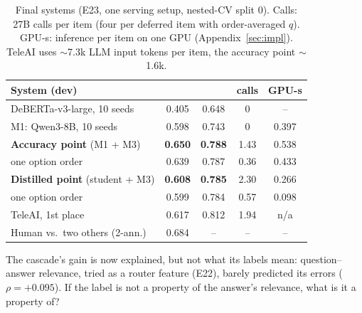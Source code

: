\begin{table}[t]
\centering
\small
\setlength{\tabcolsep}{2.2pt}
\begin{tabular}{@{}lcccc@{}}
\toprule
System (dev) & \Stwo{} & \Sone{} & calls & GPU-s \\
\midrule
DeBERTa-v3-large, 10 seeds & 0.405 & 0.648 & 0 & -- \\
M1: Qwen3-8B, 10 seeds & 0.598 & 0.743 & 0 & 0.397 \\
\textbf{Accuracy point} (M1 + M3) & \textbf{0.650} & \textbf{0.788} & 1.43 & 0.538 \\
\quad one option order & 0.639 & 0.787 & 0.36 & 0.433 \\
\textbf{Distilled point} (student + M3) & \textbf{0.608} & \textbf{0.785} & 2.30 & 0.266 \\
\quad one option order & 0.599 & 0.784 & 0.57 & 0.098 \\
\midrule
TeleAI, 1st place & 0.617 & 0.812 & 1.94 & n/a \\
Human vs.\ two others (2-ann.) & 0.684 & -- & -- & -- \\
\bottomrule
\end{tabular}
\caption{Final systems (E23, one serving setup, nested-CV split 0). Calls: 27B calls per item (four per deferred item with order-averaged $q$). GPU-s: inference per item on one GPU (Appendix~\ref{sec:impl}). TeleAI uses ${\sim}$7.3k LLM input tokens per item, the accuracy point ${\sim}$1.6k.}
\label{tab:final}
\end{table}

The cascade's gain is now explained, but not what its labels mean: question--answer relevance, tried as a router feature (E22), barely predicted its errors ($\rho = +0.095$).
If the label is not a property of the answer's relevance, what is it a property of?
